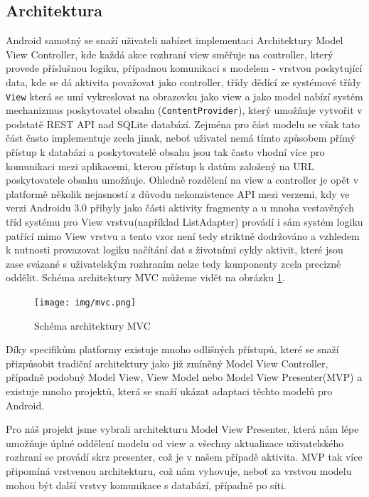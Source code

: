 \documentclass[czech,master,public,dept460,male,java,cpdeclaration]{diploma}
\begin{document}
\subsection{Architektura}
Android samotný se snaží uživateli nabízet implementaci Architektury Model View Controller\cite{bestpracticesfuturice}, kde
každá akce rozhraní view směřuje na controller, který provede příslušnou logiku, případnou komunikaci
s modelem - vrstvou poskytující data,
kde se dá aktivita považovat jako controller\cite{mvcxmvp}, třídy dědící ze systémové třídy \texttt{View} která
se umí vykreslovat na obrazovku jako view a jako model nabízí systém mechanizmus poskytovatel obsahu
(\texttt{ContentProvider}), který umožňuje vytvořit v podstatě REST API nad SQLite databází.
Zejména pro část modelu se však tato část často implementuje zcela jinak, neboť uživatel nemá tímto způsobem
přímý přístup k databázi a poskytovatelé obsahu jsou tak často vhodní více pro komunikaci mezi aplikacemi,
kterou přístup k datům založený na URL poskytovatele obsahu umožňuje. Ohledně rozdělení na view a controller je opět
v platformě několik nejasností z důvodu nekonzistence API mezi verzemi, kdy ve verzi Androidu 3.0 přibyly
jako části aktivity fragmenty a u mnoha vestavěných tříd systému pro View vrstvu(například ListAdapter)
provádí i sám systém logiku patřící mimo View vrstvu a tento vzor není tedy striktně dodržováno a vzhledem
k nutnosti provazovat logiku načítání dat s životními cykly aktivit, které jsou zase svázané s uživatelským
rozhraním nelze tedy komponenty zcela precizně oddělit\cite{mvcxmvp}.
Schéma architektury MVC můžeme vidět na obrázku \ref{fig:mvc}.

\begin{figure}[H]
        \centering
                \texttt{[image: img/mvc.png]}
        \caption{Schéma architektury MVC}
        \label{fig:mvc}
\end{figure}

Díky specifikům platformy existuje mnoho odlišných přístupů, které se snaží přizpůsobit
tradiční architektury jako již zmíněný Model View Controller, případně podobný Model View, View Model
nebo Model View Presenter(MVP) a existuje mnoho projektů, která se snaží ukázat adaptaci těchto modelů
pro Android.

Pro náš projekt jsme vybrali architekturu Model View Presenter, která nám lépe umožňuje
úplné oddělení modelu od view a všechny aktualizace uživatelského rozhraní se provádí skrz presenter,
 což je v našem případě aktivita. MVP tak více připomíná vrstvenou architekturu, což nám vyhovuje, neboť
za vrstvou modelu mohou být další vrstvy komunikace s databází, případně po síti.
\end{document}
